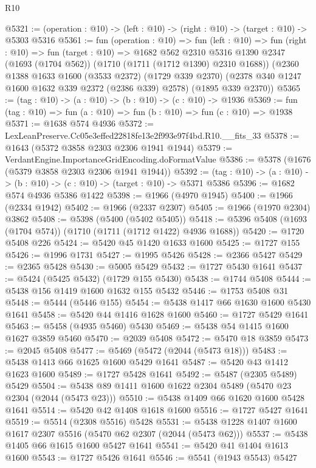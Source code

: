 \begin{lexlean}{R10}
\begin{coremodule}
@5321 := (operation : @10) -> (left : @10) -> (right : @10) -> (target : @10) -> @5303 @5316
@5361 := fun (operation : @10) =>
  fun (left : @10) =>
  fun (right : @10) =>
  fun (target : @10) =>
  @1682
    @562
    @2310
    @5316
    @1390
    @2347
    (@1693 (@1704 @562))
    (@1710 (@1711 (@1712 @1390) @2310 @1688))
    (@2360
      @1388
      @1633
      @1600
      (@3533 @2372)
      (@1729 @339 @2370)
      (@2378 @340 @1247 @1600 @1632 @339 @2372 (@2386 @339) @2578)
      (@1895 @339 @2370))
@5365 := (tag : @10) -> (a : @10) -> (b : @10) -> (c : @10) -> @1936
@5369 := fun (tag : @10) => fun (a : @10) => fun (b : @10) => fun (c : @10) => @1938
@5371 := @1638 @574 @4936
@5372 := LexLeanPreserve.Cc05e3effed22818fe13e2f993e97f4bd.R10.__fits_33
@5378 := @1643 (@5372 @3858 @2303 @2306 @1941 @1944)
@5379 := VerdantEngine.ImportanceGridEncoding.doFormatValue
@5386 := @5378 (@1676 (@5379 @3858 @2303 @2306 @1941 @1944))
@5392 := (tag : @10) -> (a : @10) -> (b : @10) -> (c : @10) -> (target : @10) -> @5371 @5386
@5396 := @1682 @574 @4936 @5386 @1422
@5398 := @1966 (@4970 @1945)
@5400 := @1966 (@2334 @1942)
@5402 := @1966 (@2337 @2307)
@5405 := @1966 (@1970 @2304) @3862
@5408 := @5398 (@5400 (@5402 @5405))
@5418 := @5396 @5408 (@1693 (@1704 @574)) (@1710 (@1711 (@1712 @1422) @4936 @1688))
@5420 := @1720 @5408 @226
@5424 := @5420 @45 @1420 @1633 @1600
@5425 := @1727 @155
@5426 := @1996 @1731
@5427 := @1995 @5426
@5428 := @2366 @5427
@5429 := @2365 @5428
@5430 := @5005 @5429
@5432 := @1727 @5430 @1641
@5437 := @5424 (@5425 @5432) (@1729 @155 @5430)
@5438 := @1744 @5408
@5444 := @5438 @156 @1419 @1600 @1632 @155 @5432
@5446 := @1753 @5408 @31
@5448 := @5444 (@5446 @155)
@5454 := @5438 @1417 @66 @1630 @1600 @5430 @1641
@5458 := @5420 @44 @1416 @1628 @1600
@5460 := @1727 @5429 @1641
@5463 := @5458 (@4935 @5460) @5430
@5469 := @5438 @54 @1415 @1600 @1627 @3859 @5460
@5470 := @2039 @5408
@5472 := @5470 @18 @3859
@5473 := @2045 @5408
@5477 := @5469 (@5472 (@2044 (@5473 @18)))
@5483 := @5438 @1413 @66 @1625 @1600 @5429 @1641
@5487 := @5420 @43 @1412 @1623 @1600
@5489 := @1727 @5428 @1641
@5492 := @5487 (@2305 @5489) @5429
@5504 := @5438 @89 @1411 @1600 @1622 @2304 @5489 (@5470 @23 @2304 (@2044 (@5473 @23)))
@5510 := @5438 @1409 @66 @1620 @1600 @5428 @1641
@5514 := @5420 @42 @1408 @1618 @1600
@5516 := @1727 @5427 @1641
@5519 := @5514 (@2308 @5516) @5428
@5531 := @5438 @1228 @1407 @1600 @1617 @2307 @5516 (@5470 @62 @2307 (@2044 (@5473 @62)))
@5537 := @5438 @1405 @66 @1615 @1600 @5427 @1641
@5541 := @5420 @41 @1404 @1613 @1600
@5543 := @1727 @5426 @1641
@5546 := @5541 (@1943 @5543) @5427

\end{coremodule}
\end{lexlean}

